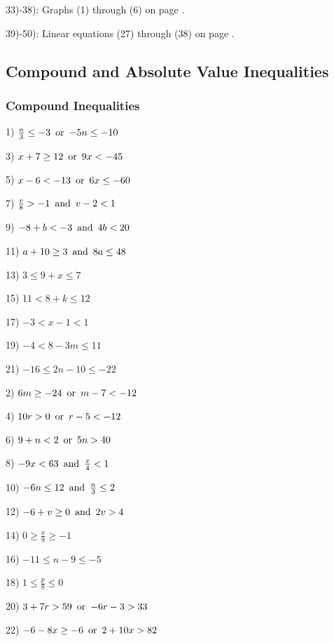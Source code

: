 {}\pp

33)-38): Graphs (1) through (6) on page \pageref{lineargraphs1}.\pp

39)-50): Linear equations (27) through (38) on page \pageref{lineargraphs2}.\pp


\pagebreak

\subsection{Compound and Absolute Value Inequalities}\par

\subsubsection{Compound Inequalities}\par

{}

\begin{multicols}{2}
  1) $\frac{n}{3} \leq - 3 \operatorname{~or~} - 5 n \leq - 10$
  
  3) $x + 7 \geq 12 \operatorname{~or~} 9 x < - 45$
  
  5) $x - 6 < - 13 \operatorname{~or~} 6 x \leq - 60$
  
  7) $\frac{v}{8} > - 1 \operatorname{~and~} v - 2 < 1$
  
  9) $- 8 + b < - 3 \operatorname{~and~} 4 b < 20$
  
  11) $a + 10 \geq 3 \operatorname{~and~} 8 a \leq 48$
  
  13) $3 \leq 9 + x \leq 7$
  
  15) $11 < 8 + k \leq 12$
  
  17) $- 3 < x - 1 < 1$
  
  19) $- 4 < 8 - 3 m \leq 11$
  
  21) $- 16 \leq 2 n - 10 \leq - 22$
  
  2) $6 m \geq - 24 \operatorname{~or~} m - 7 < - 12$
  
  4) $10 r > 0 \operatorname{~or~} r - 5 < - 12$
  
  6) $9 + n < 2 \operatorname{~or~} 5 n > 40$
  
  8) $- 9 x < 63 \operatorname{~and~} \frac{x}{4} < 1$
  
  10) $- 6 n \leq 12 \operatorname{~and~} \frac{n}{3} \leq 2$
  
  12) $- 6 + v \geq 0 \operatorname{~and~} 2 v > 4$
  
  14) $0 \geq \frac{x}{9} \geq - 1$
  
  16) $- 11 \leq n - 9 \leq - 5$
  
  18) $1 \leq \frac{p}{8} \leq 0$
  
  20) $3 + 7 r > 59 \operatorname{~or~} - 6 r - 3 > 33$
  
  22) $- 6 - 8 x \geq - 6 \operatorname{~or~} 2 + 10 x > 82$
  
\end{multicols}

